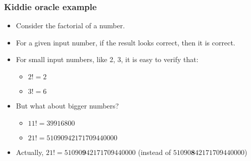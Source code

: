 \begin{frame}[hasprev=false,hasnext=false]
\label{example:kiddie-oracle}
\frametitle{Kiddie oracle example}

\begin{itemize}
	\item Consider the factorial of a number.

	\item For a given input number, if the result looks correct, then it is
	correct.

	\item For small input numbers, like 2, 3, it is easy to verify that:
	\begin{itemize}
		\item $2! = 2$
		\item $3! = 6$
	\end{itemize}

	\item But what about bigger numbers?
	\begin{itemize}
		\item $11! = 39916800$
		\item $21! = 51090942171709440000$
	\end{itemize}

	\item Actually, $21! = 51090\textbf{9}42171709440000$ (instead of $51090\textbf{8}42171709440000$)
\end{itemize}
\end{frame}